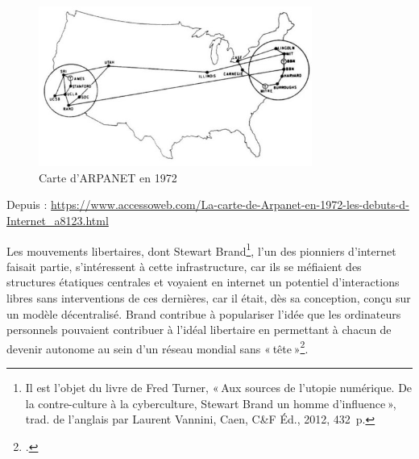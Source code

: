 \begin{figure}[h!]
	\centering
	\includegraphics[width=0.8\textwidth]{images/image24.jpg}
	\caption{Carte d’ARPANET en 1972}
	\label{fig:image24}
\end{figure}

\begin{center}
	Depuis : \url{https://www.accessoweb.com/La-carte-de-Arpanet-en-1972-les-debuts-d-Internet_a8123.html}
\end{center}


Les mouvements libertaires, dont Stewart Brand\footnote{ Il est l’objet du livre de Fred Turner, « Aux sources de l’utopie numérique. De la contre-culture à la cyberculture, Stewart Brand un homme d’influence », trad. de l’anglais par Laurent Vannini, Caen, C\&F Éd., 2012, 432 p.}, l’un des pionniers d’internet faisait partie, s’intéressent à cette infrastructure, car ils se méfiaient des structures étatiques centrales et voyaient en internet un potentiel d’interactions libres sans interventions de ces dernières, car il était, dès sa conception, conçu sur un modèle décentralisé. Brand contribue à populariser l’idée que les ordinateurs personnels pouvaient contribuer à l’idéal libertaire en permettant à chacun de devenir autonome au sein d’un réseau mondial sans « tête »\footcite[§ 5]{goeta_fred_2013}.

